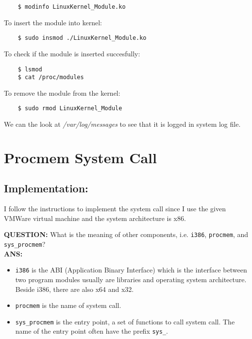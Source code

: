 \documentclass[a4paper, 11pt]{article}
\begin{document}
\begin{verbatim}
    $ modinfo LinuxKernel_Module.ko
\end{verbatim}

\par{To insert the module into kernel:}
\begin{verbatim}
    $ sudo insmod ./LinuxKernel_Module.ko
\end{verbatim}

\par{To check if the module is inserted succesfully:}

\begin{verbatim}
    $ lsmod
    $ cat /proc/modules
\end{verbatim}

\par{To remove the module from the kernel:}

\begin{verbatim}
    $ sudo rmod LinuxKernel_Module
\end{verbatim}

\par{We can the look at \textit{/var/log/messages} to see that it is logged in system log file.}

\section{Procmem System Call}

\subsection{Implementation:}

\par{I follow the instructions to implement the system call since I use the given VMWare virtual machine and the system architecture is x86.}

\newpage

\textbf{QUESTION:} What is the meaning of other components, i.e. \texttt{i386}, \texttt{procmem}, and \texttt{sys\_procmem}? \\
\textbf{ANS:}
\begin{itemize}
    \item \texttt{i386} is the ABI (Application Binary Interface) which is the interface between two program modules usually are libraries and operating system architecture. Beside i386, there are also x64 and x32.
    \item \texttt{procmem} is the name of system call.
    \item \texttt{sys\_procmem} is the entry point, a set of functions to call system call. The name of the entry point often have the prefix \texttt{sys\_}.
\end{itemize}
\end{document}
